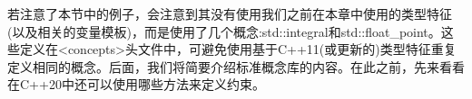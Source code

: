 若注意了本节中的例子，会注意到其没有使用我们之前在本章中使用的类型特征(以及相关的变量模板)，而是使用了几个概念:std::integral和std::float\_point。这些定义在<concepts>头文件中，可避免使用基于C++11(或更新的)类型特征重复定义相同的概念。后面，我们将简要介绍标准概念库的内容。在此之前，先来看看在C++20中还可以使用哪些方法来定义约束。































































